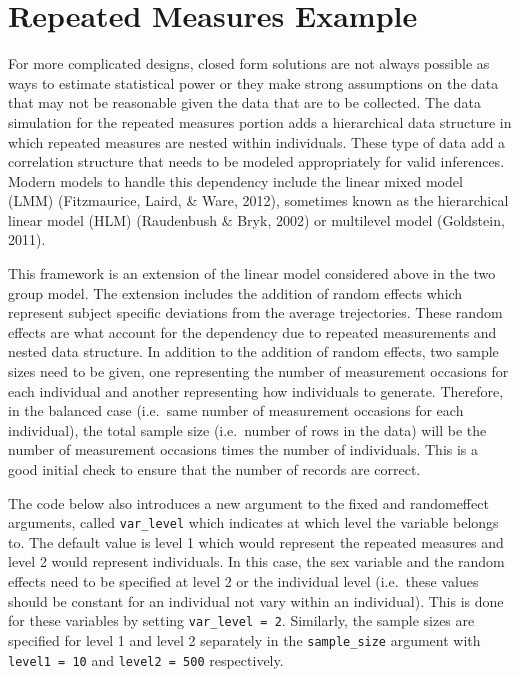 \documentclass[man,mask,floatsintext]{apa6}
\begin{document}
\hypertarget{repeated-measures-example}{%
\section{Repeated Measures Example}\label{repeated-measures-example}}

For more complicated designs, closed form solutions are not always possible as ways to estimate statistical power or they make strong assumptions on the data that may not be reasonable given the data that are to be collected. The data simulation for the repeated measures portion adds a hierarchical data structure in which repeated measures are nested within individuals. These type of data add a correlation structure that needs to be modeled appropriately for valid inferences. Modern models to handle this dependency include the linear mixed model (LMM) (Fitzmaurice, Laird, \& Ware, 2012), sometimes known as the hierarchical linear model (HLM) (Raudenbush \& Bryk, 2002) or multilevel model (Goldstein, 2011).

This framework is an extension of the linear model considered above in the two group model. The extension includes the addition of random effects which represent subject specific deviations from the average trejectories. These random effects are what account for the dependency due to repeated measurements and nested data structure. In addition to the addition of random effects, two sample sizes need to be given, one representing the number of measurement occasions for each individual and another representing how individuals to generate. Therefore, in the balanced case (i.e.~same number of measurement occasions for each individual), the total sample size (i.e.~number of rows in the data) will be the number of measurement occasions times the number of individuals. This is a good initial check to ensure that the number of records are correct.

The code below also introduces a new argument to the fixed and randomeffect arguments, called \texttt{var\_level} which indicates at which level the variable belongs to. The default value is level 1 which would represent the repeated measures and level 2 would represent individuals. In this case, the sex variable and the random effects need to be specified at level 2 or the individual level (i.e.~these values should be constant for an individual not vary within an individual). This is done for these variables by setting \texttt{var\_level\ =\ 2}. Similarly, the sample sizes are specified for level 1 and level 2 separately in the \texttt{sample\_size} argument with \texttt{level1\ =\ 10} and \texttt{level2\ =\ 500} respectively.
\end{document}
